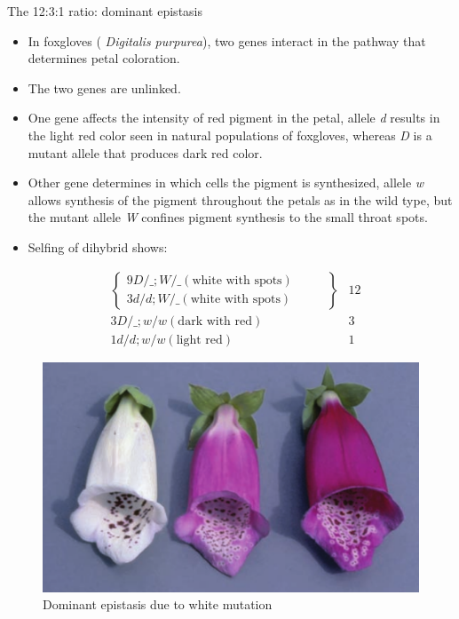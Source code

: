 \documentclass[11pt,dvipsnames,ignorenonframetext,aspectratio=169]{beamer}
\providecommand{\tightlist}{%
  \setlength{\itemsep}{0pt}\setlength{\parskip}{0pt}}
\begin{document}
\begin{frame}{The 12:3:1 ratio: dominant epistasis}
\protect\hypertarget{the-1231-ratio-dominant-epistasis}{}
\begin{itemize}
\tightlist
\item
  In foxgloves ( \emph{Digitalis purpurea}), two genes interact in the
  pathway that determines petal coloration.
\item
  The two genes are unlinked.
\item
  One gene affects the intensity of red pigment in the petal, allele
  \emph{d} results in the light red color seen in natural populations of
  foxgloves, whereas \emph{D} is a mutant allele that produces dark red
  color.
\item
  Other gene determines in which cells the pigment is synthesized,
  allele \emph{w} allows synthesis of the pigment throughout the petals
  as in the wild type, but the mutant allele \emph{W} confines pigment
  synthesis to the small throat spots.
\item
  Selfing of dihybrid shows:
\end{itemize}
\end{frame}

\begin{frame}{}
\protect\hypertarget{section-21}{}
\[
\begin{aligned}
& \left\{
\begin{array}{ll}
9D/\_; W/\_ (\textrm{white with spots}) \hspace{1cm} \\
3 d/d; W/\_ (\textrm{white with spots}) \hspace{1cm}
\end{array}
\right\} & 12 \\
& 3 D/\_; w/w (\textrm{dark with red}) \hspace{1cm} & 3 \\
& 1 d/d; w/w (\textrm{light red}) & 1
\end{aligned}
\]
\end{frame}

\begin{frame}{}
\protect\hypertarget{section-22}{}
\begin{figure}

{\centering \includegraphics[width=0.4\linewidth]{./../images/dominant_epistasis} 

}

\caption{Dominant epistasis due to white mutation}\label{fig:dominant-epistasis}
\end{figure}
\end{frame}
\end{document}
